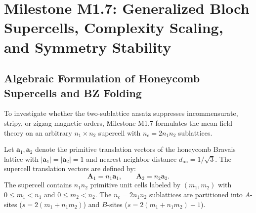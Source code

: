 \chapter{Milestone M1.7: Generalized Bloch Supercells, Complexity Scaling, and Symmetry Stability}
\label{ch:m1_7_supercells}

\section{Algebraic Formulation of Honeycomb Supercells and BZ Folding}
\label{sec:m1_7_algebraic_supercells}

To investigate whether the two-sublattice ansatz suppresses incommensurate, stripy, or zigzag magnetic orders, Milestone M1.7 formulates the mean-field theory on an arbitrary $n_1 \times n_2$ supercell with $n_c = 2 n_1 n_2$ sublattices.

Let $\mathbf{a}_1, \mathbf{a}_2$ denote the primitive translation vectors of the honeycomb Bravais lattice with $|\mathbf{a}_1| = |\mathbf{a}_2| = 1$ and nearest-neighbor distance $d_{\mathrm{nn}} = 1/\sqrt{3}$. The supercell translation vectors are defined by:
\begin{equation}
\label{eq:m1_7_supercell_vectors}
\mathbf{A}_1 = n_1 \mathbf{a}_1, \qquad \mathbf{A}_2 = n_2 \mathbf{a}_2.
\end{equation}
The supercell contains $n_1 n_2$ primitive unit cells labeled by $(m_1, m_2)$ with $0 \le m_1 < n_1$ and $0 \le m_2 < n_2$. The $n_c = 2 n_1 n_2$ sublattices are partitioned into $A$-sites ($s = 2(m_1 + n_1 m_2)$) and $B$-sites ($s = 2(m_1 + n_1 m_2) + 1$).

